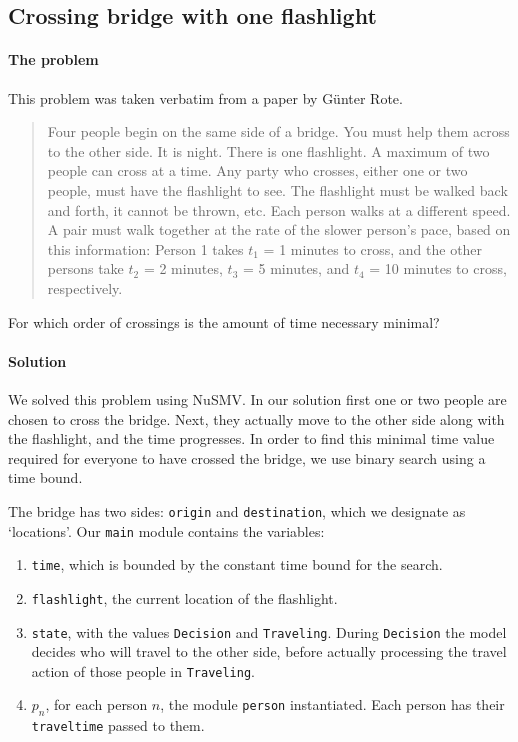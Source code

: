 \documentclass[12pt]{article}
\begin{document}
\subsection*{Crossing bridge with one flashlight}
\paragraph{The problem}

This problem was taken verbatim from a paper by G\"unter Rote. \cite{rote2002crossing}

\begin{quotation}
Four people begin on the same side of a bridge.
You must help them across to the other side.
It is night.
There is one flashlight.
A maximum of two people can cross at a time.
Any party who crosses, either one or two people, must have the flashlight to see.
The flashlight must be walked back and forth, it cannot be thrown, etc.
Each person walks at a different speed.
A pair must walk together at the rate of the slower person's pace, based on this information:
Person 1 takes $t_1$ = 1 minutes to cross, and the other persons take $t_2$ = 2
minutes, $t_3$ = 5 minutes, and $t_4$ = 10 minutes to cross, respectively.
\end{quotation}

For which order of crossings is the amount of time necessary minimal?

\paragraph{Solution}
We solved this problem using NuSMV.
In our solution first one or two people are chosen to cross the bridge.
Next, they actually move to the other side along with the flashlight, and the time progresses.
In order to find this minimal time value required for everyone to have crossed the bridge, we use binary search using a time bound.

The bridge has two sides: \texttt{origin} and \texttt{destination}, which we designate as `locations'.
Our \texttt{main} module contains the variables:
\begin{enumerate}
\item \texttt{time}, which is bounded by the constant time bound for the search.
\item \texttt{flashlight}, the current location of the flashlight.
\item \texttt{state}, with the values \texttt{Decision} and \texttt{Traveling}. During \texttt{Decision} the model decides who will travel to the other side, before actually processing the travel action of those people in \texttt{Traveling}.
\item $p_n$, for each person $n$, the module \texttt{person} instantiated.
    Each person has their \texttt{traveltime} passed to them.
\end{enumerate}
\end{document}
